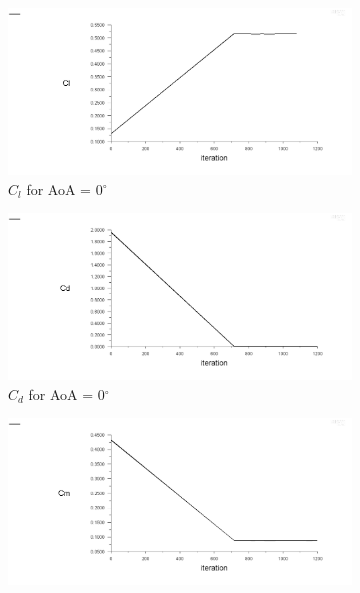 \begin{figure}[H]
  \begin{subfigure}[b]{0.5\textwidth}
    \includegraphics[width=\textwidth]{0_deg/AoA_0_cl.png}
    \caption{$C_l$ for AoA = 0$^\circ$}
    \label{fig:aoa_0_cl}
  \end{subfigure}
  \hfill
  \begin{subfigure}[b]{0.5\textwidth}
    \includegraphics[width=\textwidth]{0_deg/AoA_0_cd.png}
    \caption{$C_d$ for AoA = 0$^\circ$}
    \label{fig:aoa_0_cd}
  \end{subfigure}
  \begin{subfigure}[b]{0.5\textwidth}
    \includegraphics[width=\textwidth]{0_deg/AoA_0_cm.png}

\end{subfigure}
\end{figure}
